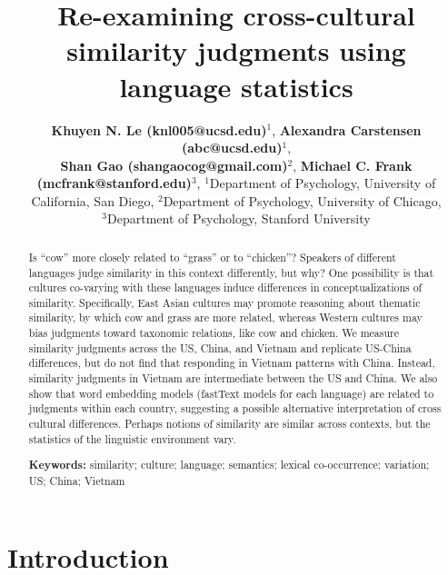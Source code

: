 \documentclass[10pt, letterpaper]{article}
\title{Re-examining cross-cultural similarity judgments using language
statistics}
\author{{\large \bf Khuyen N. Le (knl005@ucsd.edu)}$^{1}$, {\large \bf Alexandra Carstensen (abc@ucsd.edu)}$^{1}$, \\ {\large \bf Shan Gao (shangaocog@gmail.com)$^2$}, {\large \bf Michael C. Frank (mcfrank@stanford.edu)$^3$},  \AND $^1$Department of Psychology, University of California, San Diego, $^2$Department of Psychology, University of Chicago, \\ $^3$Department of Psychology, Stanford University }
\begin{document}
\maketitle

\begin{abstract}
Is ``cow'' more closely related to ``grass'' or to ``chicken''? Speakers
of different languages judge similarity in this context differently, but
why? One possibility is that cultures co-varying with these languages
induce differences in conceptualizations of similarity. Specifically,
East Asian cultures may promote reasoning about thematic similarity, by
which cow and grass are more related, whereas Western cultures may bias
judgments toward taxonomic relations, like cow and chicken. We measure
similarity judgments across the US, China, and Vietnam and replicate
US-China differences, but do not find that responding in Vietnam
patterns with China. Instead, similarity judgments in Vietnam are
intermediate between the US and China. We also show that word embedding
models (fastText models for each language) are related to judgments
within each country, suggesting a possible alternative interpretation of
cross cultural differences. Perhaps notions of similarity are similar
across contexts, but the statistics of the linguistic environment vary.

\textbf{Keywords:}
similarity; culture; language; semantics; lexical co-occurrence;
variation; US; China; Vietnam
\end{abstract}

\hypertarget{introduction}{%
\section{Introduction}\label{introduction}}
\end{document}
